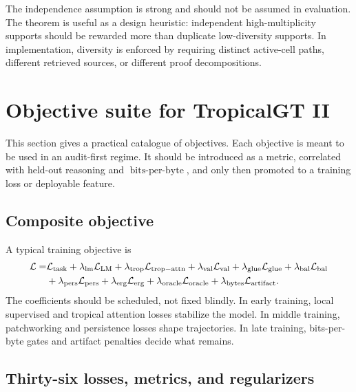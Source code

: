 \documentclass[11pt]{article}
\newcommand{\calL}{\mathcal{L}}
\newcommand{\bpb}{\operatorname{bits\mbox{-}per\mbox{-}byte}}
\begin{document}
The independence assumption is strong and should not be assumed in evaluation.  The theorem is useful as a design heuristic: independent high-multiplicity supports should be rewarded more than duplicate low-diversity supports.  In implementation, diversity is enforced by requiring distinct active-cell paths, different retrieved sources, or different proof decompositions.

\section{Objective suite for TropicalGT II}\label{sec:losses}

This section gives a practical catalogue of objectives.  Each objective is meant to be used in an audit-first regime.  It should be introduced as a metric, correlated with held-out reasoning and \(\bpb\), and only then promoted to a training loss or deployable feature.

\subsection{Composite objective}

A typical training objective is
\begin{align}
\calL=&\calL_{\rm task}+\lambda_{\rm lm}\calL_{\rm LM}+\lambda_{\rm trop}\calL_{\rm trop-attn}+\lambda_{\rm val}\calL_{\rm val}
+\lambda_{\rm glue}\calL_{\rm glue}+\lambda_{\rm bal}\calL_{\rm bal}\notag\\
&+\lambda_{\rm pers}\calL_{\rm pers}+\lambda_{\rm erg}\calL_{\rm erg}+\lambda_{\rm oracle}\calL_{\rm oracle}+\lambda_{\rm bytes}\calL_{\rm artifact}.
\end{align}
The coefficients should be scheduled, not fixed blindly.  In early training, local supervised and tropical attention losses stabilize the model.  In middle training, patchworking and persistence losses shape trajectories.  In late training, bits-per-byte gates and artifact penalties decide what remains.

\subsection{Thirty-six losses, metrics, and regularizers}
\end{document}
